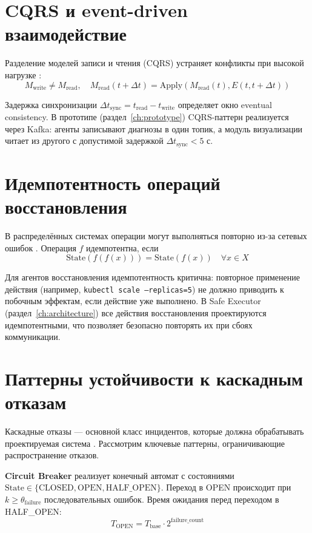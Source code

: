 \section{CQRS и event-driven взаимодействие}

Разделение моделей записи и чтения (CQRS) устраняет конфликты при высокой нагрузке \cite{cqrs_pattern,event_sourcing}:
\begin{equation}
M_{\text{write}} \neq M_{\text{read}}, \quad M_{\text{read}}(t+\Delta t) = \text{Apply}(M_{\text{read}}(t), E(t, t+\Delta t))
\label{eq:cqrs_sync}
\end{equation}

Задержка синхронизации $\Delta t_{\text{sync}} = t_{\text{read}} - t_{\text{write}}$ определяет окно eventual consistency. В прототипе (раздел~\ref{ch:prototype}) CQRS-паттерн реализуется через Kafka: агенты записывают диагнозы в один топик, а модуль визуализации читает из другого с допустимой задержкой $\Delta t_{\text{sync}} < 5$ с.

\section{Идемпотентность операций восстановления}

В распределённых системах операции могут выполняться повторно из-за сетевых ошибок \cite{kleppmann_designing_data}. Операция $f$ идемпотентна, если
\begin{equation}
\text{State}(f(f(x))) = \text{State}(f(x)) \quad \forall x \in X
\label{eq:idempotency}
\end{equation}

Для агентов восстановления идемпотентность критична: повторное применение действия (например, \texttt{kubectl scale --replicas=5}) не должно приводить к побочным эффектам, если действие уже выполнено. В Safe Executor (раздел~\ref{ch:architecture}) все действия восстановления проектируются идемпотентными, что позволяет безопасно повторять их при сбоях коммуникации.

\section{Паттерны устойчивости к каскадным отказам}

Каскадные отказы --- основной класс инцидентов, которые должна обрабатывать проектируемая система \cite{circuit_breaker_pattern,retry_pattern}. Рассмотрим ключевые паттерны, ограничивающие распространение отказов.

\textbf{Circuit Breaker} реализует конечный автомат с состояниями $\text{State} \in \{\text{CLOSED}, \text{OPEN}, \text{HALF\_OPEN}\}$. Переход в OPEN происходит при $k \geq \theta_{\text{failure}}$ последовательных ошибок. Время ожидания перед переходом в HALF\_OPEN:
\begin{equation}
T_{\text{OPEN}} = T_{\text{base}} \cdot 2^{\text{failure\_count}}
\label{eq:circuit_breaker_timeout}
\end{equation}

